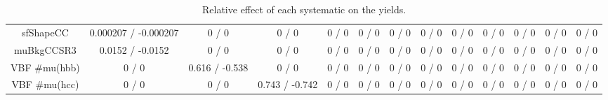 \documentclass[10pt]{article}
\begin{document}
\begin{table}[htbp]
\begin{center}
\begin{tabular}{|c|c|c|c|c|c|c|c|c|c|c|c|c|}
  sfShapeCC & 0.000207 / -0.000207 & 0 / 0 & 0 / 0 & 0 / 0 & 0 / 0 & 0 / 0 & 0 / 0 & 0 / 0 & 0 / 0 & 0 / 0 & 0 / 0 & 0 / 0 \\ 
  muBkgCCSR3 & 0.0152 / -0.0152 & 0 / 0 & 0 / 0 & 0 / 0 & 0 / 0 & 0 / 0 & 0 / 0 & 0 / 0 & 0 / 0 & 0 / 0 & 0 / 0 & 0 / 0 \\ 
  VBF #mu(hbb) & 0 / 0 & 0.616 / -0.538 & 0 / 0 & 0 / 0 & 0 / 0 & 0 / 0 & 0 / 0 & 0 / 0 & 0 / 0 & 0 / 0 & 0 / 0 & 0 / 0 \\ 
  VBF #mu(hcc) & 0 / 0 & 0 / 0 & 0.743 / -0.742 & 0 / 0 & 0 / 0 & 0 / 0 & 0 / 0 & 0 / 0 & 0 / 0 & 0 / 0 & 0 / 0 & 0 / 0 \\ 
\hline 
\end{tabular} 
\caption{Relative effect of each systematic on the yields.} 
\end{center} 
\end{table} 
\end{document}
